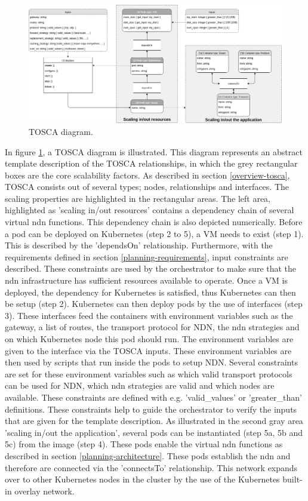 \begin{figure}[H]
\centering
\includegraphics[width=\columnwidth]{Images/tosca-diagram.png}
\caption{TOSCA diagram.}
\label{fig:tosca-diagram}
\end{figure}

In figure \ref{fig:tosca-diagram}, a TOSCA diagram is illustrated. This diagram represents an abstract template description of the TOSCA relationships, in which the grey rectangular boxes are the core scalability factors. As described in section \ref{overview-tosca}, TOSCA consists out of several types; nodes, relationships and interfaces. The scaling properties are highlighted in the rectangular areas. The left area, highlighted as 'scaling in/out resources' contains a dependency chain of several virtual \gls{ndn} functions. This dependency chain is also depicted numerically. Before a pod can be deployed on Kubernetes (step 2 to 5), a VM needs to exist (step 1). This is described by the 'dependsOn' relationship. Furthermore, with the requirements defined in section \ref{planning-requirements}, input constraints are described. These constraints are used by the orchestrator to make sure that the \gls{ndn} infrastructure has sufficient resources available to operate. Once a VM is deployed, the dependency for Kubernetes is satisfied, thus Kubernetes can then be setup (step 2). Kubernetes can then deploy pods by the use of interfaces (step 3). These interfaces feed the containers with environment variables such as the gateway, a list of routes, the transport protocol for NDN, the \gls{ndn} strategies and on which Kubernetes node this pod should run. The environment variables are given to the interface via the TOSCA inputs. These environment variables are then used by scripts that run inside the pods to setup NDN. Several constraints are set for these environment variables such as which valid transport protocols can be used for NDN, which \gls{ndn} strategies are valid and which nodes are available. These constraints are defined with e.g. 'valid\_values' or 'greater\_than' definitions. These constraints help to guide the orchestrator to verify the inputs that are given for the template description. As illustrated in the second gray area 'scaling in/out the application', several pods can be instantiated (step 5a, 5b and 5c) from the image (step 4). These pods enable the virtual \gls{ndn} functions as described in section \ref{planning-architecture}. These pods establish the \gls{ndn} and therefore are connected via the 'connectsTo' relationship. This network expands over to other Kubernetes nodes in the cluster by the use of the Kubernetes built-in overlay network.

